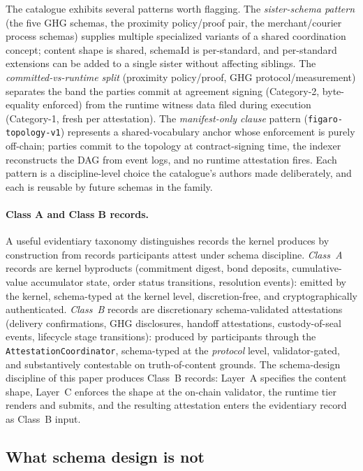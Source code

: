 \documentclass[11pt,a4paper]{article}
\theoremstyle{definition}
\theoremstyle{remark}
\begin{document}
The catalogue exhibits several patterns worth flagging. The
\emph{sister-schema pattern} (the five GHG schemas, the proximity
policy/proof pair, the merchant/courier process schemas) supplies
multiple specialized variants of a shared coordination concept;
content shape is shared, schemaId is per-standard, and per-standard
extensions can be added to a single sister without affecting
siblings. The \emph{committed-vs-runtime split} (proximity
policy/proof, GHG protocol/measurement) separates the band the
parties commit at agreement signing (Category-2, byte-equality
enforced) from the runtime witness data filed during execution
(Category-1, fresh per attestation). The \emph{manifest-only
clause} pattern (\texttt{figaro-topology-v1}) represents a
shared-vocabulary anchor whose enforcement is purely off-chain;
parties commit to the topology at contract-signing time, the
indexer reconstructs the DAG from event logs, and no runtime
attestation fires. Each pattern is a discipline-level choice the
catalogue's authors made deliberately, and each is reusable by
future schemas in the family.

\paragraph{Class A and Class B records.}
A useful evidentiary taxonomy distinguishes records the kernel
produces by construction from records participants attest under
schema discipline. \emph{Class~A} records are kernel byproducts
(commitment digest, bond deposits, cumulative-value accumulator
state, order status transitions, resolution events): emitted by
the kernel, schema-typed at the kernel level, discretion-free, and
cryptographically authenticated. \emph{Class~B} records are
discretionary schema-validated attestations (delivery confirmations,
GHG disclosures, handoff attestations, custody-of-seal events,
lifecycle stage transitions): produced by participants through the
\texttt{AttestationCoordinator}, schema-typed at the \emph{protocol}
level, validator-gated, and substantively contestable on
truth-of-content grounds. The schema-design discipline of this paper
produces Class~B records: Layer~A specifies the content shape,
Layer~C enforces the shape at the on-chain validator, the runtime
tier renders and submits, and the resulting attestation enters the
evidentiary record as Class~B input.

\subsection{What schema design is not}
\end{document}
